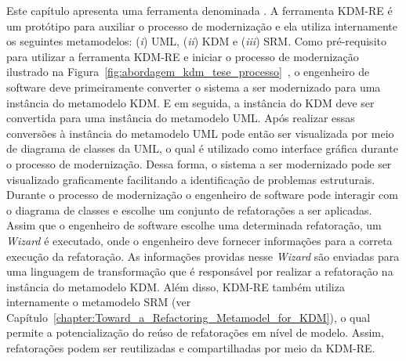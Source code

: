 Este capítulo apresenta uma ferramenta denominada . %
%
%
%
A ferramenta KDM-RE é um protótipo para auxiliar o processo de modernização e ela utiliza internamente os seguintes metamodelos: (\textit{i}) UML, (\textit{ii}) KDM e (\textit{iii}) SRM. Como pré-requisito para utilizar a ferramenta KDM-RE e iniciar o processo de modernização ilustrado na Figura~\ref{fig:abordagem_kdm_tese_processo}~, o engenheiro de software deve primeiramente converter o sistema a ser modernizado para uma instância do metamodelo KDM. E em seguida, a instância do KDM deve ser convertida para uma instância do metamodelo UML. Após realizar essas conversões à instância do metamodelo UML pode então ser visualizada por meio de diagrama de classes da UML, o qual é utilizado como interface gráfica durante o processo de modernização. Dessa forma, o sistema a ser modernizado pode ser visualizado graficamente facilitando a identificação de problemas estruturais. Durante o processo de modernização o engenheiro de software pode interagir com o diagrama de classes e escolhe um conjunto de refatorações a ser aplicadas. Assim que o engenheiro de software escolhe uma determinada refatoração, um \textit{Wizard} é executado, onde o engenheiro deve fornecer informações para a correta execução da refatoração. As informações providas nesse \textit{Wizard} são enviadas para uma linguagem de transformação que é responsável por realizar a refatoração na instância do metamodelo KDM. Além disso, KDM-RE também utiliza internamente o metamodelo SRM (ver Capítulo~\ref{chapter:Toward_a_Refactoring_Metamodel_for_KDM}), o qual permite a potencialização do reúso de refatorações em nível de modelo. Assim, refatorações podem ser reutilizadas e compartilhadas por meio da KDM-RE.


